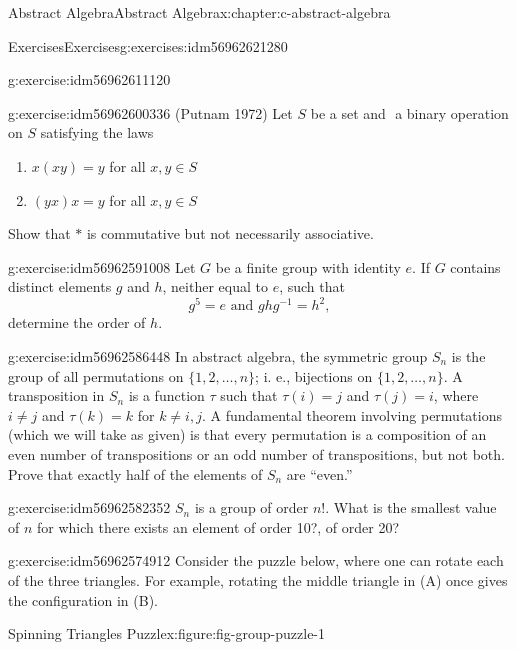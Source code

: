 \documentclass[twoside,10pt,]{book}
\numberwithin{equation}{section}
\begin{document}
\begin{chapterptx}{Abstract Algebra}{}{Abstract Algebra}{}{}{x:chapter:c-abstract-algebra}
\begin{exercises-section}{Exercises}{}{Exercises}{}{}{g:exercises:idm56962621280}
\begin{divisionexercise}{2}{}{}{g:exercise:idm56962611120}
\end{divisionexercise}%
\begin{divisionexercise}{3}{}{}{g:exercise:idm56962600336}%
(Putnam 1972) Let \(S\) be a set and \(\) a binary operation on \(S\) satisfying the laws%
\begin{enumerate}[label=(\roman*)]
\item{}\(x(xy)=y\) for all \(x,y \in S\)%
\item{}\((yx)x=y\) for all \(x,y \in S\)%
\end{enumerate}
Show that \(*\) is commutative but not necessarily associative.%
\end{divisionexercise}%
\begin{divisionexercise}{4}{}{}{g:exercise:idm56962591008}%
Let \(G\) be a finite group with identity \(e\).  If \(G\) contains distinct elements \(g\) and \(h\), neither equal to \(e\), such that%
\begin{equation*}
g^5=e \textrm{  and  }g h g^{-1} = h^2,
\end{equation*}
determine the order of \(h\).%
\end{divisionexercise}%
\begin{divisionexercise}{5}{}{}{g:exercise:idm56962586448}%
%
In abstract algebra, the symmetric group \(S_n\) is the group of all permutations on \(\{1, 2, \dots, n\}\); i. e., bijections on \(\{1, 2, \dots, n\}\).  A transposition in \(S_n\) is a function \(\tau\) such that \(\tau(i)=j\) and \(\tau(j)=i\), where \(i \neq j\) and \(\tau(k)=k\) for \(k \neq i, j\).  A fundamental theorem involving permutations (which we will take as given) is that every permutation is a composition of an even number of transpositions or  an odd number of transpositions, but not both.   Prove that exactly half of the elements of \(S_n\) are ``even.''%
\end{divisionexercise}%
\begin{divisionexercise}{6}{}{}{g:exercise:idm56962582352}%
\(S_n\) is a group of order \(n!\).  What is the smallest value of \(n\) for which there exists an element of order 10?, of order 20?%
\end{divisionexercise}%
\begin{divisionexercise}{7}{}{}{g:exercise:idm56962574912}%
Consider the puzzle below, where one can rotate each of the three triangles. For example, rotating the middle triangle in (A) once gives the configuration in (B).%
\begin{figureptx}{Spinning Triangles Puzzle}{x:figure:fig-group-puzzle-1}{}%

\end{figureptx}
\end{divisionexercise}
\end{exercises-section}
\end{chapterptx}
\end{document}
